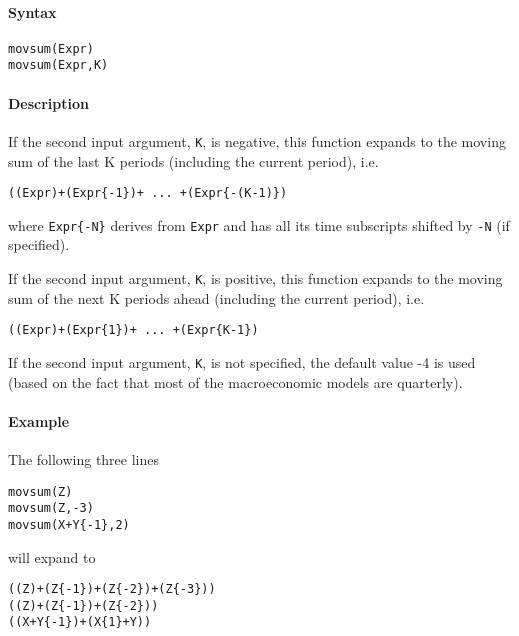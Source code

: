 


	\paragraph{Syntax}\label{syntax}

\begin{verbatim}
movsum(Expr)
movsum(Expr,K)
\end{verbatim}

\paragraph{Description}\label{description}

If the second input argument, \texttt{K}, is negative, this function
expands to the moving sum of the last K periods (including the current
period), i.e.

\begin{verbatim}
((Expr)+(Expr{-1})+ ... +(Expr{-(K-1)})
\end{verbatim}

where \texttt{Expr\{-N\}} derives from \texttt{Expr} and has all its
time subscripts shifted by \texttt{-N} (if specified).

If the second input argument, \texttt{K}, is positive, this function
expands to the moving sum of the next K periods ahead (including the
current period), i.e.

\begin{verbatim}
((Expr)+(Expr{1})+ ... +(Expr{K-1})
\end{verbatim}

If the second input argument, \texttt{K}, is not specified, the default
value -4 is used (based on the fact that most of the macroeconomic
models are quarterly).

\paragraph{Example}\label{example}

The following three lines

\begin{verbatim}
movsum(Z)
movsum(Z,-3)
movsum(X+Y{-1},2)
\end{verbatim}

will expand to

\begin{verbatim}
((Z)+(Z{-1})+(Z{-2})+(Z{-3}))
((Z)+(Z{-1})+(Z{-2}))
((X+Y{-1})+(X{1}+Y))
\end{verbatim}



